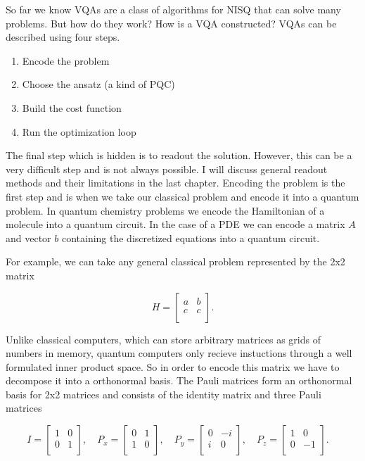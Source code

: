 \documentclass[12pt, oneside]{book}
\begin{document}
So far we know VQAs are a class of algorithms for NISQ that can solve many problems. But how do they work? How is a VQA constructed? 
VQAs can be described using four steps. 

\begin{enumerate}
  \item Encode the problem 
  \item Choose the ansatz (a kind of PQC)
  \item Build the cost function
  \item Run the optimization loop
\end{enumerate}

The final step which is hidden is to readout the solution. However, this can be a very difficult step and is not always possible. I will 
discuss general readout methods and their limitations in the last chapter. Encoding the problem is the first step and is
when we take our classical problem and encode it into a quantum problem. In quantum chemistry problems we 
encode the Hamiltonian of a molecule into a quantum circuit. In the case of a PDE we can encode a matrix $A$ and vector $b$ 
containing the discretized equations into a quantum circuit. 

For example, we can take any general classical problem represented by the 2x2 matrix 

$$
H = \begin{bmatrix} a & b \\ c & c \\ \end{bmatrix}.
$$

Unlike classical computers, which can store arbitrary matrices as grids of numbers in memory, quantum computers only 
recieve instuctions through a well formulated inner product space. So in order to encode this matrix we have to decompose it into a 
orthonormal basis. The Pauli matrices form an orthonormal basis for 2x2 matrices and consists of the identity matrix and three
Pauli matrices 

$$
I = \begin{bmatrix} 1 & 0 \\ 0 & 1 \\ \end{bmatrix}, \quad 
P_x = \begin{bmatrix} 0 & 1 \\ 1 & 0 \\ \end{bmatrix}, \quad
P_y = \begin{bmatrix} 0 & -i \\ i & 0 \\ \end{bmatrix}, \quad
P_z = \begin{bmatrix} 1 & 0 \\ 0 & -1 \\ \end{bmatrix}. \quad
$$
\end{document}
